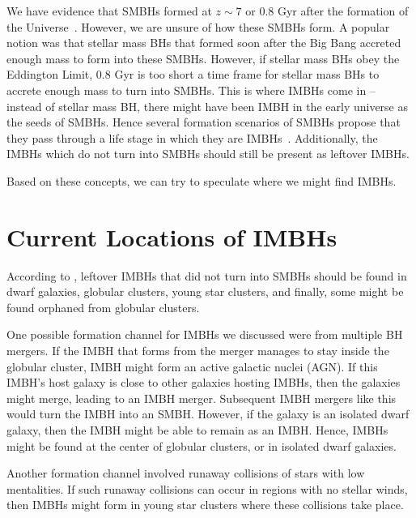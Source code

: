 We have evidence that SMBHs formed at $z\sim7$ or 0.8 Gyr after the
formation of the Universe~\cite{mezcua2017observational}. However, we are
unsure of how these SMBHs form. A popular notion was that stellar mass
BHs that formed soon after the Big Bang accreted enough mass to form
into these SMBHs. However, if stellar mass BHs obey the Eddington
Limit, 0.8 Gyr is too short a time frame for stellar mass BHs to
accrete enough mass to turn into SMBHs. This is where IMBHs come in --
instead of stellar mass BH, there might have been IMBH in the early
universe as the seeds of SMBHs. Hence several formation scenarios of
SMBHs propose that they pass through a life stage in which they are
IMBHs~\cite{mezcua2017observational}. Additionally, the IMBHs which do not
turn into SMBHs should still be present as leftover IMBHs.


Based on these concepts, we can try to speculate where we might find
IMBHs.


\section{Current Locations of IMBHs}\label{apdx.imbhlocations}

According to \citet{mezcua2017observational}, leftover IMBHs that did not turn
into SMBHs should be found in dwarf galaxies, globular clusters, young
star clusters, and finally, some might be found orphaned from globular
clusters.

One possible formation channel for IMBHs we discussed were from multiple
BH mergers. If the IMBH that forms from the merger manages to stay
inside the globular cluster, IMBH might form an active galactic nuclei
(AGN). If this IMBH's host galaxy is close to other galaxies hosting
IMBHs, then the galaxies might merge, leading to an IMBH merger.
Subsequent IMBH mergers like this would turn the IMBH into an SMBH.
However, if the galaxy is an isolated dwarf galaxy, then the IMBH might
be able to remain as an IMBH. Hence, IMBHs might be found at the center
of globular clusters, or in isolated dwarf galaxies.

Another formation channel involved runaway collisions of stars with low
mentalities. If such runaway collisions can occur in regions with no
stellar winds, then IMBHs might form in young star clusters where these
collisions take place.



